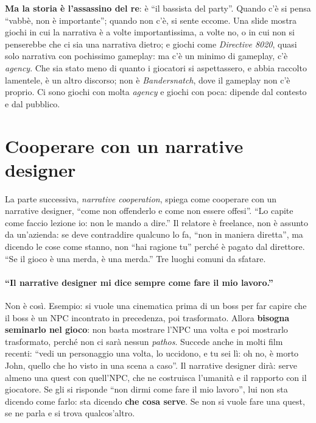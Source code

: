 \textbf{Ma la storia è l'assassino del re}: è ``il bassista del party''. Quando
c'è si pensa ``vabbè, non è importante''; quando non c'è, si sente
eccome. Una slide mostra giochi in cui la narrativa è a volte importantissima,
a volte no, o in cui non si penserebbe che ci sia una narrativa dietro; e
giochi come \emph{Directive 8020}, quasi solo narrativa con pochissimo
gameplay: ma c'è un minimo di gameplay, c'è \emph{agency}. Che sia stato meno
di quanto i giocatori si aspettassero, e abbia raccolto lamentele, è un altro
discorso; non è \emph{Bandersnatch}, dove il gameplay non c'è proprio. Ci sono
giochi con molta \emph{agency} e giochi con poca: dipende dal contesto e dal
pubblico.

\section{Cooperare con un narrative designer}
\label{p3:sec:cooperare}

La parte successiva, \emph{narrative cooperation}, spiega come cooperare con
un narrative designer, ``come non offenderlo e come non essere offesi''. ``Lo
capite come faccio lezione io: non le mando a dire.'' Il relatore è
freelance, non è assunto da un'azienda: se deve contraddire qualcuno lo fa,
``non in maniera diretta'', ma dicendo le cose come stanno, non ``hai ragione
tu'' perché è pagato dal direttore. ``Se il gioco è una merda, è una merda.''
Tre luoghi comuni da sfatare.

\paragraph{``Il narrative designer mi dice sempre come fare il mio lavoro.''}
Non è così. Esempio: si vuole una cinematica prima di un boss per far capire
che il boss è un NPC incontrato in precedenza, poi trasformato. Allora
\textbf{bisogna seminarlo nel gioco}: non basta mostrare l'NPC una volta e poi
mostrarlo trasformato, perché non ci sarà nessun \emph{pathos}. Succede anche
in molti film recenti: ``vedi un personaggio una volta, lo uccidono, e tu sei
lì: oh no, è morto John, quello che ho visto in una scena a caso''. Il
narrative designer dirà: serve almeno una quest con quell'NPC, che ne
costruisca l'umanità e il rapporto con il giocatore. Se gli si risponde ``non
dirmi come fare il mio lavoro'', lui non sta dicendo come farlo: sta dicendo
\textbf{che cosa serve}. Se non si vuole fare una quest, se ne parla e si
trova qualcos'altro.

